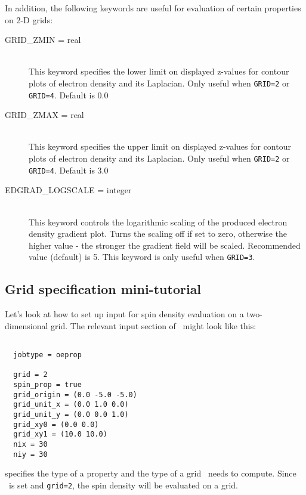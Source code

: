 In addition, the following keywords are useful for evaluation of certain
properties on 2-D grids:

\begin{description}

\item[GRID\_ZMIN = real]\mbox{}\\
This keyword specifies the lower limit on displayed
z-values for contour plots of electron density and 
its Laplacian. Only useful when {\tt GRID=2} or {\tt GRID=4}.
Default is 0.0

\item[GRID\_ZMAX = real]\mbox{}\\
This keyword specifies the upper limit on displayed
z-values for contour plots of electron density and 
its Laplacian. Only useful when {\tt GRID=2} or {\tt GRID=4}.
Default is 3.0

\item[EDGRAD\_LOGSCALE = integer]\mbox{}\\
This keyword controls the logarithmic scaling of the produced electron density gradient 
plot. Turns the scaling off if set to zero, otherwise the higher value - 
the stronger the gradient field will be scaled.
Recommended value (default) is 5. This keyword is only useful when
{\tt GRID=3}.

\end{description}

\subsection{Grid specification mini-tutorial}

Let's look at how to set up input for spin density evaluation on a
two-dimensional grid.  The relevant input section of \PSIthree\ might look like
this:
\begin{verbatim}

  jobtype = oeprop

  grid = 2
  spin_prop = true
  grid_origin = (0.0 -5.0 -5.0)
  grid_unit_x = (0.0 1.0 0.0)
  grid_unit_y = (0.0 0.0 1.0)
  grid_xy0 = (0.0 0.0)
  grid_xy1 = (10.0 10.0)
  nix = 30
  niy = 30

\end{verbatim}
 specifies the type of a property and the type of a grid
\PSIoeprop\ needs to compute.
Since \ is set and {\tt grid=2}, the spin density will be
evaluated on a grid.

